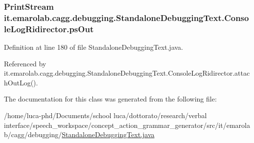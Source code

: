 \hypertarget{classit_1_1emarolab_1_1cagg_1_1debugging_1_1StandaloneDebuggingText_1_1ConsoleLogRidirector_a9e30942ca14484e287625036d6700b21}{
\subsubsection[{ps\-Out}]{\setlength{\rightskip}{0pt plus 5cm}Print\-Stream it.\-emarolab.\-cagg.\-debugging.\-Standalone\-Debugging\-Text.\-Console\-Log\-Ridirector.\-ps\-Out\hspace{0.3cm}{\ttfamily [private]}}}\label{classit_1_1emarolab_1_1cagg_1_1debugging_1_1StandaloneDebuggingText_1_1ConsoleLogRidirector_a9e30942ca14484e287625036d6700b21}


Definition at line 180 of file Standalone\-Debugging\-Text.\-java.



Referenced by it.\-emarolab.\-cagg.\-debugging.\-Standalone\-Debugging\-Text.\-Console\-Log\-Ridirector.\-attach\-Out\-Log().



The documentation for this class was generated from the following file\-:\begin{DoxyCompactItemize}
\item 
/home/luca-\/phd/\-Documents/school luca/dottorato/research/verbal interface/speech\-\_\-workspace/concept\-\_\-action\-\_\-grammar\-\_\-generator/src/it/emarolab/cagg/debugging/\hyperlink{StandaloneDebuggingText_8java}{Standalone\-Debugging\-Text.\-java}\end{DoxyCompactItemize}
